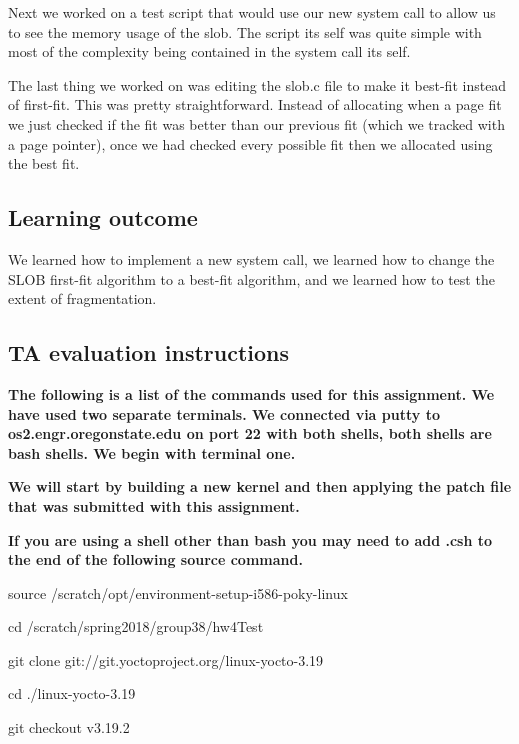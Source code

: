 \documentclass[journal,10pt,onecolumn,letterpaper,draftclsnofoot]{IEEEtran}
\begin{document}
Next we worked on a test script that would use our new system call to allow us to see the memory usage of the slob. The script its self was quite simple with most of the complexity being contained in the system call its self.

The last thing we worked on was editing the slob.c file to make it best-fit instead of first-fit. This was pretty straightforward. Instead of allocating when a page fit we just checked if the fit was better than our previous fit (which we tracked with a page pointer), once we had checked every possible fit then we allocated using the best fit.

\subsection{Learning outcome}
We learned how to implement a new system call, we learned how to change the SLOB first-fit algorithm to a best-fit algorithm, and we learned how to test the extent of fragmentation. 

\subsection{TA evaluation instructions}
\textbf{The following is a list of the commands used for this assignment. We have used two separate terminals. We connected via putty to os2.engr.oregonstate.edu on port 22 with both shells, both shells are bash shells. We begin with terminal one.\newline}

\textbf{We will start by building a new kernel and then applying the patch file that was submitted with this assignment.\newline}

\textbf{If you are using a shell other than bash you may need to add .csh to the end of the following source command.\newline}

source /scratch/opt/environment-setup-i586-poky-linux\newline

cd /scratch/spring2018/group38/hw4Test\newline

git clone git://git.yoctoproject.org/linux-yocto-3.19\newline

cd ./linux-yocto-3.19\newline

git checkout v3.19.2\newline
\end{document}

